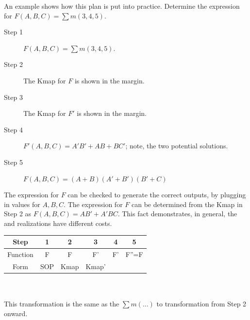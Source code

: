 \begin{process:minimizationKmap}
An example shows how this plan is put into practice.
Determine the \POSmin expression for $F(A,B,C) = \sum m(3,4,5)$.

\begin{description}

\item [Step 1] $F(A,B,C) = \sum m(3,4,5)$.

\item [Step 2] The Kmap for $F$ is shown in the margin.


\item [Step 3] The Kmap for $F'$ is shown in the margin.


\item [Step 4] $F'(A,B,C)= A'B'+AB+BC'$; note, the
		two potential solutions.
\item [Step 5] $F(A,B,C)= (A+B)(A'+B')(B'+C)$ 
		
\end{description}

The \POSmin expression for $F$ can be checked to generate
the correct outputs, by plugging in values for $A,B,C$.
The \SOPmin expression
for $F$ can be determined from the Kmap in Step 2 as
$F(A,B,C)=AB'+A'BC$.  This fact demonstrates, in general,
the \SOPmin and \POSmin realizations have different costs.

\begin{tabular}{|c|c|c|c|c|c|}\hline
Step	  & 1  & 2  & 3  & 4  & 5  \\ \hline
Function  & F  & F  & F'  & F' &  F''=F \\ \hline
Form	  & SOP & Kmap & Kmap' & \SOPmin & \POSmin \\ \hline
\end{tabular}
\\ \\
This transformation is the same as the $\sum m(\ldots)$ to \POSmin
transformation from Step 2 onward.


\end{process:minimizationKmap}
